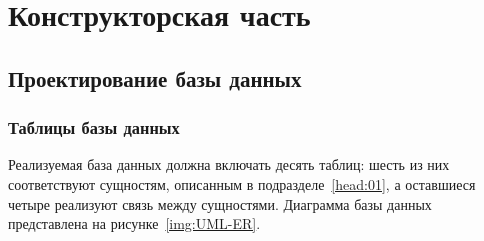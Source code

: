 \chapter{\label{design}Конструкторская часть}

\section{Проектирование базы данных}
\subsection{Таблицы базы данных}

Реализуемая база данных должна включать десять таблиц: шесть из них соответствуют
сущностям, описанным в подразделе~\ref{head:01}, а оставшиеся четыре реализуют
связь между сущностями. Диаграмма базы данных представлена на
рисунке~\ref{img:UML-ER}.


